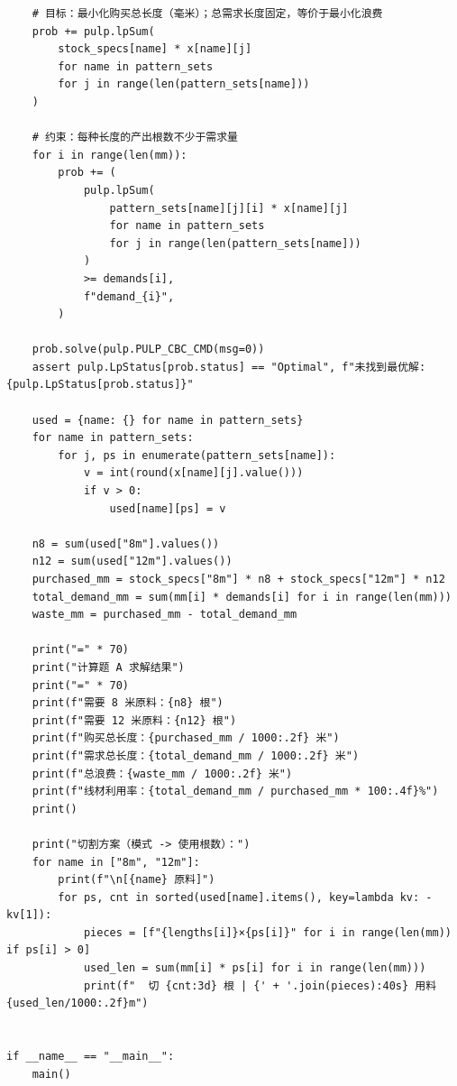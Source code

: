 \documentclass[12pt,a4paper]{ctexart}
\begin{document}
\begin{lstlisting}
    # 目标：最小化购买总长度（毫米）；总需求长度固定，等价于最小化浪费
    prob += pulp.lpSum(
        stock_specs[name] * x[name][j]
        for name in pattern_sets
        for j in range(len(pattern_sets[name]))
    )

    # 约束：每种长度的产出根数不少于需求量
    for i in range(len(mm)):
        prob += (
            pulp.lpSum(
                pattern_sets[name][j][i] * x[name][j]
                for name in pattern_sets
                for j in range(len(pattern_sets[name]))
            )
            >= demands[i],
            f"demand_{i}",
        )

    prob.solve(pulp.PULP_CBC_CMD(msg=0))
    assert pulp.LpStatus[prob.status] == "Optimal", f"未找到最优解: {pulp.LpStatus[prob.status]}"

    used = {name: {} for name in pattern_sets}
    for name in pattern_sets:
        for j, ps in enumerate(pattern_sets[name]):
            v = int(round(x[name][j].value()))
            if v > 0:
                used[name][ps] = v

    n8 = sum(used["8m"].values())
    n12 = sum(used["12m"].values())
    purchased_mm = stock_specs["8m"] * n8 + stock_specs["12m"] * n12
    total_demand_mm = sum(mm[i] * demands[i] for i in range(len(mm)))
    waste_mm = purchased_mm - total_demand_mm

    print("=" * 70)
    print("计算题 A 求解结果")
    print("=" * 70)
    print(f"需要 8 米原料：{n8} 根")
    print(f"需要 12 米原料：{n12} 根")
    print(f"购买总长度：{purchased_mm / 1000:.2f} 米")
    print(f"需求总长度：{total_demand_mm / 1000:.2f} 米")
    print(f"总浪费：{waste_mm / 1000:.2f} 米")
    print(f"线材利用率：{total_demand_mm / purchased_mm * 100:.4f}%")
    print()

    print("切割方案（模式 -> 使用根数）：")
    for name in ["8m", "12m"]:
        print(f"\n[{name} 原料]")
        for ps, cnt in sorted(used[name].items(), key=lambda kv: -kv[1]):
            pieces = [f"{lengths[i]}×{ps[i]}" for i in range(len(mm)) if ps[i] > 0]
            used_len = sum(mm[i] * ps[i] for i in range(len(mm)))
            print(f"  切 {cnt:3d} 根 | {' + '.join(pieces):40s} 用料 {used_len/1000:.2f}m")


if __name__ == "__main__":
    main()
\end{lstlisting}

\clearpage
\end{document}
